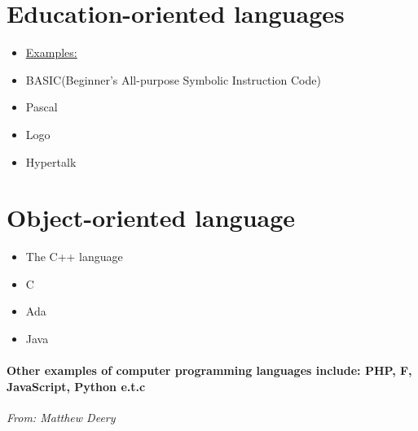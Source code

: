 \documentclass{article}
\begin{document}
	\section{Education-oriented languages}
	\begin{itemize}
	\item\underline{Examples:}
	\item BASIC(Beginner’s All-purpose Symbolic Instruction Code)
	\item Pascal
	\item Logo
	 \item Hypertalk
	\end{itemize}
	
	\section{Object-oriented language}
	\begin{itemize}
	\item The C++ language 
	\item C
	\item Ada
	\item Java
\end{itemize}
	\paragraph{Other examples of computer programming languages include: PHP, F, JavaScript, Python e.t.c}
	 \emph{From: Matthew Deery}
	
	
\end{document}

